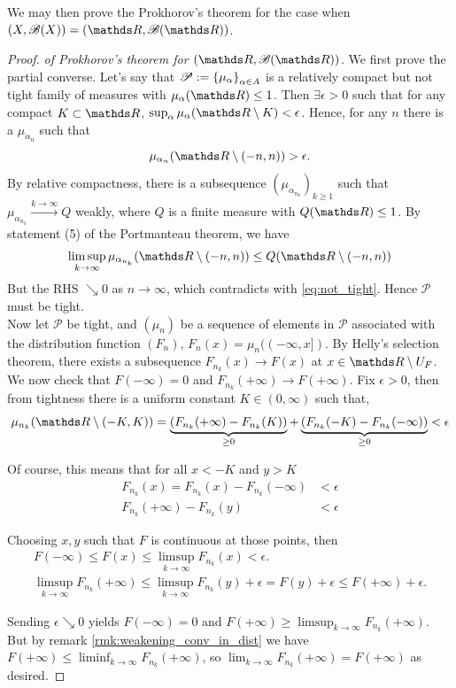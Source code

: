 We may then prove the Prokhorov's theorem for the case when $(X,\B(X)) = (\R,\B(\R))$.
\begin{proof}
\textit{of Prokhorov's theorem for $(\R,\B(\R))$.} We first prove the partial converse. Let's say that $\mathcal{P} := \left\{ \mu_\alpha \right \}_{\alpha \in A}$ is a relatively compact but not tight family of measures with $\mu_\alpha(\R) \leq 1$. Then $\exists \epsilon > 0$ such that for any compact $K \subset \R$, $\sup_\alpha \mu_\alpha(\R \setminus K) < \epsilon$. Hence, for any $n$ there is a $\mu_{\alpha_n}$ such that
\begin{equation}
\mu_{\alpha_n}(\R\setminus (-n,n)) > \epsilon. \label{eq:not_tight}
\end{equation}
By relative compactness, there is a subsequence $(\mu_{\alpha_{n_k}})_{k\geq 1}$ such that $\mu_{\alpha_{n_k}} \overset{k\to\infty}{\to} Q$ weakly, where $Q$ is a finite measure with $Q(\R) \leq 1$. By statement (5) of the Portmanteau theorem, we have
\begin{equation}
\limsup_{k\to\infty} \mu_{\alpha_{n_k}}(\R\setminus (-n,n)) \leq Q(\R \setminus (-n,n))
\end{equation}
But the RHS $\searrow 0$ as $n \to \infty$, which contradicts with \eqref{eq:not_tight}. Hence $\mathcal{P}$ must be tight. \\

Now let $\mathcal{P}$ be tight, and $(\mu_n)$ be a sequence of elements in $\mathcal{P}$ associated with the distribution function $(F_n)$, $F_n(x) = \mu_n((-\infty,x])$. By Helly's selection theorem, there exists a subsequence $F_{n_k}(x) \to F(x)$ at $x \in \R \setminus U_F$. We now check that $F(-\infty) = 0$ and $F_{n_k}(+\infty) \to F(+\infty)$. Fix $\epsilon > 0$, then from tightness there is a uniform constant $K \in (0,\infty)$ such that,
\begin{equation}
\mu_{n_k}(\R \setminus (-K,K)) = \underbrace{(F_{n_k}(+\infty) - F_{n_k}(K))}_{\geq 0} + \underbrace{(F_{n_k}(-K) - F_{n_k}(-\infty))}_{\geq 0} < \epsilon
\end{equation}

Of course, this means that for all $x < -K$ and $y > K$
\begin{align*}
    F_{n_k}(x) = F_{n_k}(x) - F_{n_k}(-\infty) &< \epsilon \\
    F_{n_k}(+\infty) - F_{n_k}(y) &< \epsilon
\end{align*}

Choosing $x, y$ such that $F$ is continuous at those points, then 
\begin{gather*}
    F(-\infty) \leq F(x) \leq \limsup_{k\to\infty} F_{n_k}(x) < \epsilon. \\
    \limsup_{k\to\infty} F_{n_k}(+\infty) \leq \limsup_{k\to\infty} F_{n_k}(y) + \epsilon = F(y) + \epsilon \leq F(+\infty) + \epsilon.
\end{gather*}

Sending $\epsilon \searrow 0$ yields $F(-\infty) = 0$ and $F(+\infty) \geq \limsup_{k\to\infty} F_{n_k}(+\infty)$. But by remark \ref{rmk:weakening_conv_in_dist} we have $F(+\infty) \leq \liminf_{k\to\infty} F_{n_k}(+\infty)$, so $\lim_{k\to\infty} F_{n_k}(+\infty) = F(+\infty)$ as desired.
\end{proof}

